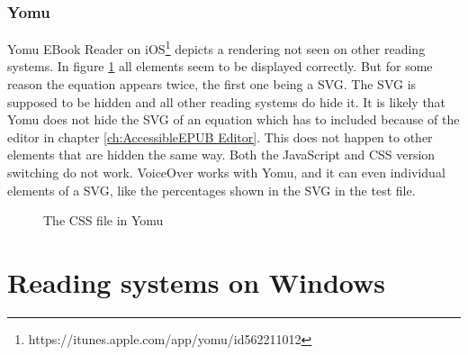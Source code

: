 \subsubsection{Yomu}
Yomu EBook Reader on iOS\footnote{https://itunes.apple.com/app/yomu/id562211012} depicts a rendering not seen on other reading systems. In figure \ref{fig:yomu} all elements seem to be displayed correctly. But for some reason the equation appears twice, the first one being a SVG. The SVG is supposed to be hidden and all other reading systems do hide it. It is likely that Yomu does not hide the SVG of an equation which has to included because of the editor in chapter \ref{ch:AccessibleEPUB Editor}. This does not happen to other elements that are hidden the same way. Both the JavaScript and CSS version switching do not work. VoiceOver works with Yomu, and it can even individual elements of a SVG, like the percentages shown in the SVG in the test file.
\begin{figure}[H]
	\centering
	\caption{The CSS file in Yomu}
	\label{fig:yomu}
\end{figure}

\section{Reading systems on Windows}
